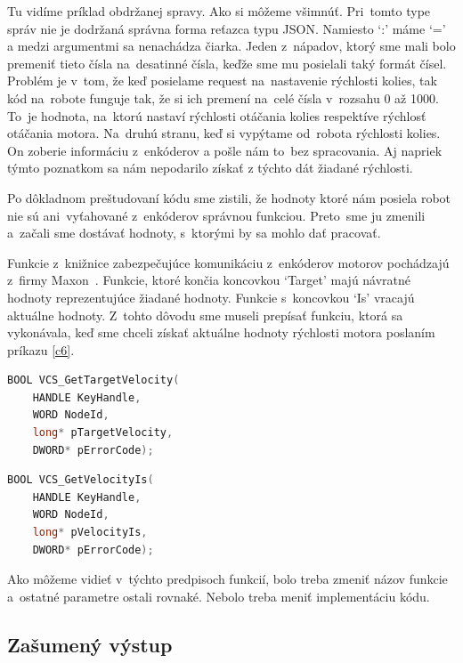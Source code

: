 Tu vidíme príklad obdržanej spravy. Ako si môžeme všimnúť. Pri~tomto type správ nie je dodržaná správna forma reťazca typu JSON. Namiesto `:'
máme `=' a medzi argumentmi sa nenachádza čiarka. Jeden z~nápadov, ktorý sme mali bolo premeniť tieto čísla na~desatinné čísla, keďže sme mu
posielali taký formát čísel. Problém je v~tom, že keď posielame request na~nastavenie rýchlosti kolies, tak kód na~robote funguje tak, že si
ich premení na~celé čísla v~rozsahu 0 až 1000. To~je hodnota, na~ktorú nastaví rýchlosti otáčania kolies respektíve rýchlosť otáčania motora.
Na~druhú stranu, keď si vypýtame od~robota rýchlosti kolies. On zoberie informáciu z~enkóderov a pošle nám to~bez spracovania. Aj napriek týmto
poznatkom sa nám nepodarilo získať z týchto dát žiadané rýchlosti.

Po dôkladnom preštudovaní kódu sme zistili, že hodnoty ktoré nám posiela robot nie sú ani~vyťahované z~enkóderov správnou funkciou. Preto~sme ju
zmenili a~začali sme dostávať hodnoty, s~ktorými by sa mohlo dať pracovať.

Funkcie z~knižnice zabezpečujúce komunikáciu z~enkóderov motorov pochádzajú z~firmy Maxon~\cite{EPOSdoc}. Funkcie, ktoré končia koncovkou `Target'
majú návratné hodnoty reprezentujúce žiadané hodnoty. Funkcie s~koncovkou `Is' vracajú aktuálne hodnoty. Z~tohto dôvodu sme museli prepísať
funkciu, ktorá sa vykonávala, keď sme chceli získať aktuálne hodnoty rýchlosti motora poslaním príkazu \ref{c6}.


\label{VelocityIs}
\begin{lstlisting}[language=C++]
BOOL VCS_GetTargetVelocity(
	HANDLE KeyHandle,
	WORD NodeId,
	long* pTargetVelocity,
	DWORD* pErrorCode);
\end{lstlisting}

\begin{lstlisting}[language=C++]
BOOL VCS_GetVelocityIs(
	HANDLE KeyHandle,
	WORD NodeId,
	long* pVelocityIs,
	DWORD* pErrorCode);
\end{lstlisting}

\noindent Ako môžeme vidieť v~týchto predpisoch funkcií, bolo treba zmeniť názov funkcie a~ostatné parametre ostali rovnaké.
Nebolo treba meniť implementáciu kódu.

\subsection{Zašumený výstup}

